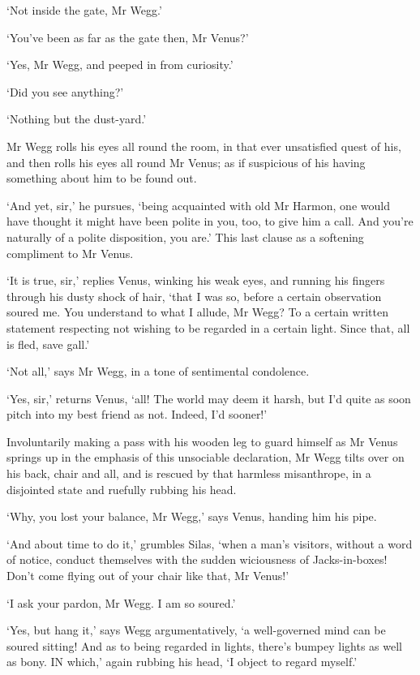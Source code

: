 ‘Not inside the gate, Mr Wegg.’

‘You’ve been as far as the gate then, Mr Venus?’

‘Yes, Mr Wegg, and peeped in from curiosity.’

‘Did you see anything?’

‘Nothing but the dust-yard.’

Mr Wegg rolls his eyes all round the room, in that ever unsatisfied
quest of his, and then rolls his eyes all round Mr Venus; as if
suspicious of his having something about him to be found out.

‘And yet, sir,’ he pursues, ‘being acquainted with old Mr Harmon, one
would have thought it might have been polite in you, too, to give him a
call. And you’re naturally of a polite disposition, you are.’ This last
clause as a softening compliment to Mr Venus.

‘It is true, sir,’ replies Venus, winking his weak eyes, and running
his fingers through his dusty shock of hair, ‘that I was so, before a
certain observation soured me. You understand to what I allude, Mr Wegg?
To a certain written statement respecting not wishing to be regarded in
a certain light. Since that, all is fled, save gall.’

‘Not all,’ says Mr Wegg, in a tone of sentimental condolence.

‘Yes, sir,’ returns Venus, ‘all! The world may deem it harsh, but I’d
quite as soon pitch into my best friend as not. Indeed, I’d sooner!’

Involuntarily making a pass with his wooden leg to guard himself as Mr
Venus springs up in the emphasis of this unsociable declaration, Mr Wegg
tilts over on his back, chair and all, and is rescued by that harmless
misanthrope, in a disjointed state and ruefully rubbing his head.

‘Why, you lost your balance, Mr Wegg,’ says Venus, handing him his pipe.

‘And about time to do it,’ grumbles Silas, ‘when a man’s visitors,
without a word of notice, conduct themselves with the sudden wiciousness
of Jacks-in-boxes! Don’t come flying out of your chair like that, Mr
Venus!’

‘I ask your pardon, Mr Wegg. I am so soured.’

‘Yes, but hang it,’ says Wegg argumentatively, ‘a well-governed mind can
be soured sitting! And as to being regarded in lights, there’s bumpey
lights as well as bony. IN which,’ again rubbing his head, ‘I object to
regard myself.’

